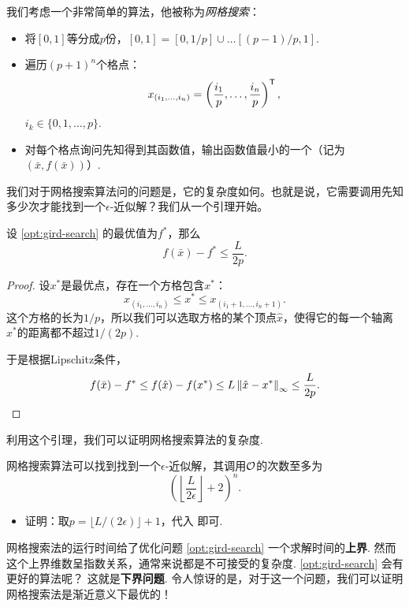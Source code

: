我们考虑一个非常简单的算法，他被称为\emph{网格搜索}：
\begin{itemize}
    \item 将$[0,1]$等分成$p$份，$[0,1]=[0,1/p]\cup\dots[(p-1)/p,1]$.
    \item 遍历$(p+1)^n$个格点：
    \[x_{(i_1,\dots,i_n)}=\left(\frac{i_1}{p},\dots,\frac{i_n}{p}\right)^{\mathsf{T}},\]
    $i_k\in\{0,1,\dots,p\}$.
    \item 对每个格点询问先知得到其函数值，输出函数值最小的一个（记为$(\bar{x},f(\bar x))$）.
\end{itemize}

我们对于网格搜索算法问的问题是，它的复杂度如何。也就是说，它需要调用先知多少次才能找到一个$\epsilon$-近似解？我们从一个引理开始。

\begin{lemma}\label{lemma:gird-search}
    设 \eqref{opt:gird-search} 的最优值为$f^*$，那么
\[f(\bar x)-f^*\leq\frac{L}{2p}.\]
\end{lemma}
\begin{proof}
设$x^*$是最优点，存在一个方格包含$x^*$：
\[x_{(i_1,\dots,i_n)}\leq x^*\leq x_{(i_1+1,\dots,i_n+1)}.\]
这个方格的长为$1/p$，所以我们可以选取方格的某个顶点$\hat x$，使得它的每一个轴离$x^*$的距离都不超过$1/(2p)$.

于是根据Lipschitz条件，
    \[f(\bar x)-f^*\leq f(\hat x)-f(x^*)\leq L\left\|\hat x- x^*\right\|_\infty\leq \frac{L}{2p}.\]
\end{proof}

利用这个引理，我们可以证明网格搜索算法的复杂度.
\begin{theorem}
    网格搜索算法可以找到找到一个$\epsilon$-近似解，其调用$\mathcal{O}$的次数至多为
    \[\left(\left\lfloor\frac{L}{2\epsilon}\right\rfloor+2\right)^n.\]
\end{theorem}
\begin{itemize}
    \item 证明：取$p=\lfloor L/(2\epsilon)\rfloor+1$，代入 即可.
\end{itemize}

 网格搜索法的运行时间给了优化问题 \eqref{opt:gird-search} 一个求解时间的\textbf{上界}. 然而这个上界维数呈指数关系，通常来说都是不可接受的复杂度. \eqref{opt:gird-search} 会有更好的算法呢？ 这就是\textbf{下界问题}. 令人惊讶的是，对于这一个问题，我们可以证明网格搜索法是渐近意义下最优的！

